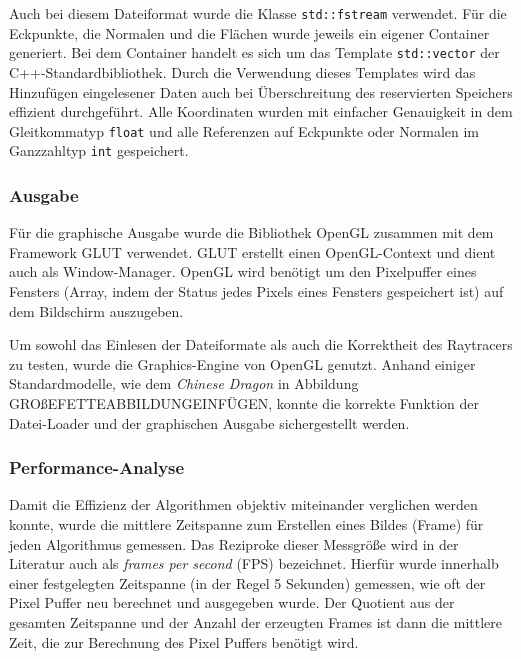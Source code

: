 \documentclass[crop=false]{standalone}
\begin{document}
        Auch bei diesem Dateiformat wurde die Klasse \texttt{std::fstream} verwendet.
        Für die Eckpunkte, die Normalen und die Flächen wurde jeweils ein eigener Container generiert.
        Bei dem Container handelt es sich um das Template \texttt{std::vector} der C++-Standardbibliothek.
        Durch die Verwendung dieses Templates wird das Hinzufügen eingelesener Daten auch bei Überschreitung des reservierten Speichers effizient durchgeführt.
        Alle Koordinaten wurden mit einfacher Genauigkeit in dem Gleitkommatyp \texttt{float} und alle Referenzen auf Eckpunkte oder Normalen im Ganzzahltyp \texttt{int} gespeichert.

      \subsubsection{Ausgabe} %
      \label{ssub:ausgabe}
        Für die graphische Ausgabe wurde die Bibliothek OpenGL zusammen mit dem Framework GLUT verwendet.
        GLUT erstellt einen OpenGL-Context und dient auch als Window-Manager.
        OpenGL wird benötigt um den Pixelpuffer eines Fensters (Array, indem der Status jedes Pixels eines Fensters gespeichert ist) auf dem Bildschirm auszugeben.

        Um sowohl das Einlesen der Dateiformate als auch die Korrektheit des Raytracers zu testen, wurde die Graphics-Engine von OpenGL genutzt.
        Anhand einiger Standardmodelle, wie dem \textit{Chinese Dragon} in Abbildung GROßEFETTEABBILDUNGEINFÜGEN, konnte die korrekte Funktion der Datei-Loader und der graphischen Ausgabe sichergestellt werden.

      \subsubsection{Performance-Analyse} %
      \label{ssub:performance_analyse}
        Damit die Effizienz der Algorithmen objektiv miteinander verglichen werden konnte, wurde die mittlere Zeitspanne zum Erstellen eines Bildes (Frame) für jeden Algorithmus gemessen.
        Das Reziproke dieser Messgröße wird in der Literatur auch als \textit{frames per second} (FPS) bezeichnet.
        Hierfür wurde innerhalb einer festgelegten Zeitspanne (in der Regel 5 Sekunden) gemessen, wie oft der Pixel Puffer neu berechnet und ausgegeben wurde.
        Der Quotient aus der gesamten Zeitspanne und der Anzahl der erzeugten Frames ist dann die mittlere Zeit, die zur Berechnung des Pixel Puffers benötigt wird.
\end{document}
